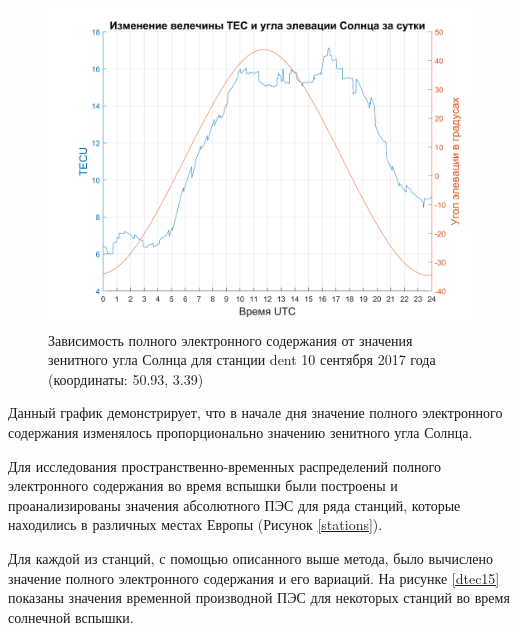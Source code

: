 \documentclass[a4paper]{article}
\begin{document}
\begin{figure}[h]
\centering
\includegraphics[width = 1\linewidth]{pics/clean_pics/tec_sun.png}
\caption{Зависимость полного электронного содержания от значения зенитного угла Солнца  для станции dent 10 сентября 2017 года (координаты: 50.93, 3.39)}
\label{tecsun}
\end{figure} 

Данный график демонстрирует, что в начале дня значение полного электронного содержания изменялось пропорционально значению зенитного угла Солнца. %


Для исследования пространственно-временных распределений полного электронного содержания во время вспышки были построены и проанализированы значения абсолютного  ПЭС для ряда станций, которые находились в различных местах Европы (Рисунок \ref{stations}).

Для каждой из станций, с помощью описанного выше метода, было вычислено значение полного электронного содержания и его вариаций. На рисунке \ref{dtec15} показаны значения временной производной ПЭС для некоторых станций во время солнечной вспышки.
\end{document}
